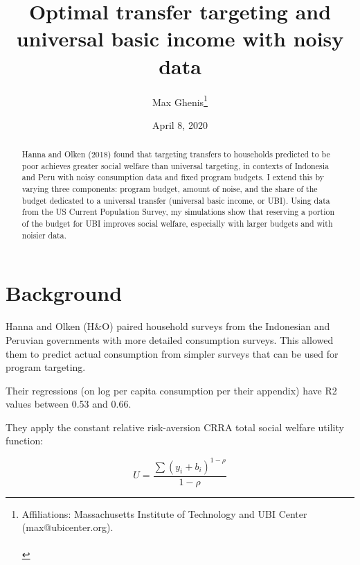 \documentclass[12pt]{article}
\begin{document}
\begin{titlepage}
\title{Optimal transfer targeting and universal basic income with noisy data}
\author{Max Ghenis\thanks{Affiliations: Massachusetts Institute of Technology and UBI Center (max@ubicenter.org).
\protect \\
\protect \\%
}}

\date{April 8, 2020}
\maketitle
\begin{abstract}
\noindent Hanna and Olken (2018) found that targeting transfers to households 
predicted to be poor achieves greater social welfare than universal targeting, 
in contexts of Indonesia and Peru with noisy consumption data and fixed program 
budgets. I extend this by varying three components: program budget, amount of 
noise, and the share of the budget dedicated to a universal transfer (universal 
basic income, or UBI). Using data from the US Current Population Survey, my 
simulations show that reserving a portion of the budget for UBI improves social 
welfare, especially with larger budgets and with noisier data.

\bigskip
\end{abstract}
\setcounter{page}{0}
\thispagestyle{empty}
\end{titlepage}
\pagebreak \newpage




\doublespacing


\section{Background} \label{sec:background}

Hanna and Olken (H\&O) paired household surveys from the Indonesian and 
Peruvian governments with more detailed consumption surveys. This allowed them 
to predict actual consumption from simpler surveys that can be used for program 
targeting.

Their regressions (on log per capita consumption per their appendix) have R2 
values between 0.53 and 0.66.

They apply the constant relative risk-aversion CRRA total social welfare 
utility function:

\begin{equation}
U = \frac{\sum{(y_i + b_i)^{1-\rho}}}{1-\rho}
\end{equation}
\end{document}
